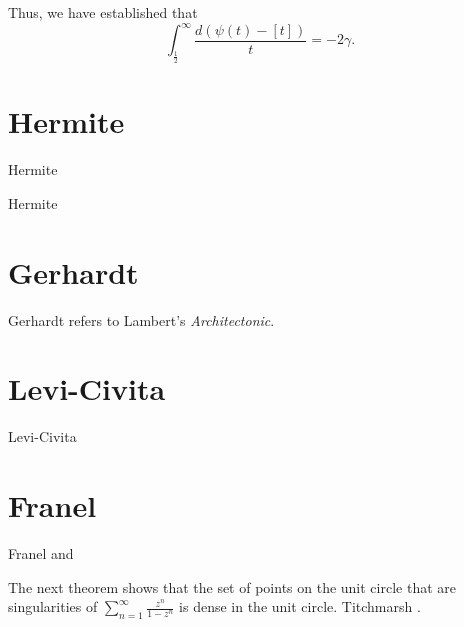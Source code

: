 \documentclass{amsart}
\begin{document}
Thus, we have established that
\[
\int_{\frac{1}{2}}^\infty \frac{d(\psi(t)-[t])}{t} = -2\gamma.
\]


\section{Hermite}
Hermite \cite{hermite1884}

Hermite \cite{hermite}


\section{Gerhardt}
Gerhardt \cite[p.~196]{gerhardt} refers to Lambert's {\em Architectonic}. 

\section{Levi-Civita}
Levi-Civita \cite{levicivita}


\section{Franel}
Franel \cite{franel51} and \cite{franel52}



The next theorem shows that  
 the set of points on the unit circle that are singularities of $\sum_{n=1}^\infty \frac{z^n}{1-z^n}$ is dense in the unit
circle. Titchmarsh \cite[pp.~160--161, \S 4.71]{titchmarsh}.
\end{document}
